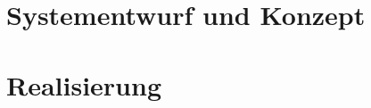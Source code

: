 

\section{Systementwurf und Konzept} \label{systementwurf-3}



\newpage
\section{Realisierung} \label{realisierung-3}


\iffalse %
\newpage
\section{Emotionsinduktion} \label{emotionsinduktion-3}



\newpage
\section{Messreihe} \label{messreihe-3}



\newpage
\section{Mustererkennung} \label{mustererkennung-3}


\newpage
\section{Ergebnisse} \label{ergenisse-3}

\fi